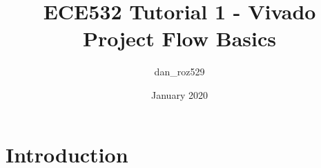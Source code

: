 \documentclass{article}
\title{ECE532 Tutorial 1 - Vivado Project Flow Basics}
\author{dan_roz529 }
\date{January 2020}
\begin{document}
\maketitle

\section{Introduction}
\end{document}
